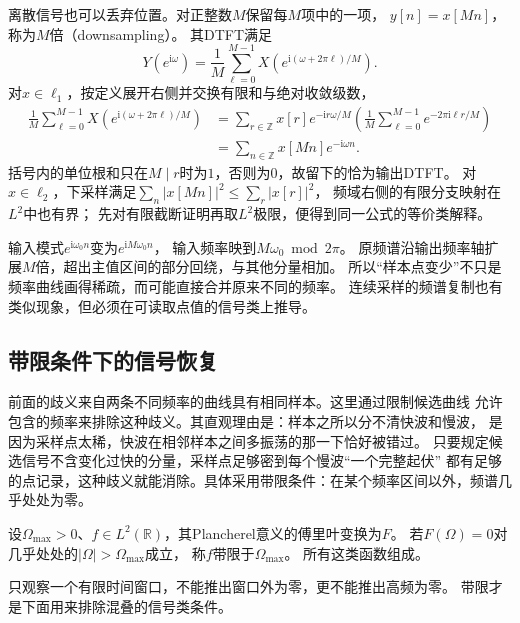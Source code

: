 离散信号也可以丢弃位置。对正整数$M$保留每$M$项中的一项，
$y[n]=x[Mn]$，称为$M$倍（downsampling）。
其DTFT满足
\begin{equation}
  Y(e^{\mathrm i\omega})=\frac1M\sum_{\ell=0}^{M-1}
  X\left(e^{\mathrm i(\omega+2\pi\ell)/M}\right).
  \label{eq:signal-analysis-downsampling-spectrum}
\end{equation}
对$x\in\ell_1$，按定义展开右侧并交换有限和与绝对收敛级数，
\begin{align*}
  \frac1M\sum_{\ell=0}^{M-1}X\left(e^{\mathrm i(\omega+2\pi\ell)/M}\right)
  &=\sum_{r\in\mathbb Z}x[r]e^{-\mathrm ir\omega/M}
    \left(\frac1M\sum_{\ell=0}^{M-1}e^{-2\pi\mathrm i\ell r/M}\right)\\
  &=\sum_{n\in\mathbb Z}x[Mn]e^{-\mathrm i\omega n}.
\end{align*}
括号内的单位根和只在$M\mid r$时为$1$，否则为$0$，故留下的恰为输出DTFT。
对$x\in\ell_2$，下采样满足$\sum_n|x[Mn]|^2\leq\sum_r|x[r]|^2$，
频域右侧的有限分支映射在$L^2$中也有界；
先对有限截断证明再取$L^2$极限，便得到同一公式的等价类解释。

输入模式$e^{\mathrm i\omega_0n}$变为$e^{\mathrm iM\omega_0n}$，
输入频率映到$M\omega_0\bmod2\pi$。
原频谱沿输出频率轴扩展$M$倍，超出主值区间的部分回绕，与其他分量相加。
所以“样本点变少”不只是频率曲线画得稀疏，而可能直接合并原来不同的频率。
连续采样的频谱复制也有类似现象，但必须在可读取点值的信号类上推导。

\subsection{带限条件下的信号恢复}
\label{sec:signal-bandlimited-recovery}

前面的歧义来自两条不同频率的曲线具有相同样本。这里通过限制候选曲线
允许包含的频率来排除这种歧义。其直观理由是：样本之所以分不清快波和慢波，
是因为采样点太稀，快波在相邻样本之间多振荡的那一下恰好被错过。
只要规定候选信号不含变化过快的分量，采样点足够密到每个慢波“一个完整起伏”
都有足够的点记录，这种歧义就能消除。具体采用带限条件：在某个频率区间以外，频谱几乎处处为零。
\begin{definition}[平方可积带限信号]
  \label{def:signal-analysis-bandlimited-space}
  设$\Omega_{\max}>0$、$f\in L^2(\mathbb R)$，其Plancherel意义的傅里叶变换为$F$。
  若$F(\Omega)=0$对几乎处处的$|\Omega|>\Omega_{\max}$成立，
  称$f$带限于$\Omega_{\max}$。
  所有这类函数组成。
\end{definition}
只观察一个有限时间窗口，不能推出窗口外为零，更不能推出高频为零。
带限才是下面用来排除混叠的信号类条件。


